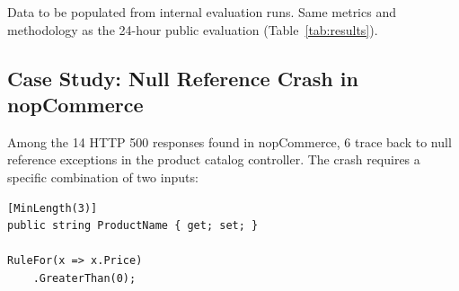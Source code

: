 \documentclass[conference]{IEEEtran}
\begin{document}
\begin{table}[htbp]
\caption{24-Hour Results on Internal Enterprise Microservices}
\label{tab:internal}
\centering
\footnotesize
\setlength{\tabcolsep}{3.5pt}
\vspace{2pt}
\footnotesize{Data to be populated from internal evaluation runs. Same metrics and methodology as the 24-hour public evaluation (Table~\ref{tab:results}).}
\end{table}

\subsection{Case Study: Null Reference Crash in nopCommerce}
\label{sec:case_study}

Among the 14 HTTP 500 responses found in nopCommerce, 6 trace back to null reference exceptions in the product catalog controller. The crash requires a specific combination of two inputs:
\begin{lstlisting}
[MinLength(3)]
public string ProductName { get; set; }

RuleFor(x => x.Price)
    .GreaterThan(0);
\end{lstlisting}
\end{document}
